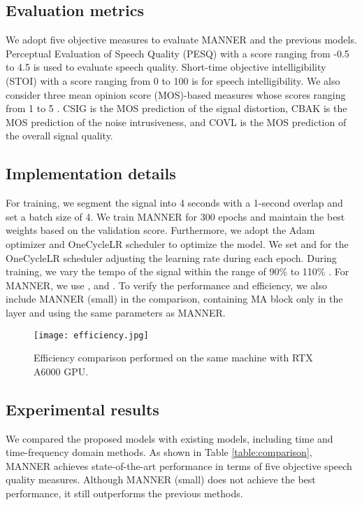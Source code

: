 \documentclass{article}
\begin{document}
\subsection{Evaluation metrics}
\label{sec:metric}
We adopt five objective measures to evaluate MANNER and the previous models. Perceptual Evaluation of Speech Quality (PESQ) \cite{recommendation2001perceptual} with a score ranging from -0.5 to 4.5 is used to evaluate speech quality. Short-time objective intelligibility (STOI) \cite{taal2011algorithm} with a score ranging from 0 to 100 is for speech intelligibility. We also consider three mean opinion score (MOS)-based measures whose scores ranging from 1 to 5 \cite{hu2007evaluation}. CSIG is the MOS prediction of the signal distortion, CBAK is the MOS prediction of the noise intrusiveness, and COVL is the MOS prediction of the overall signal quality.

\subsection{Implementation details}
\label{sec:implementation}
For training, we segment the signal into 4 seconds with a 1-second overlap and set a batch size of 4. We train MANNER for 300 epochs and maintain the best weights based on the validation score. Furthermore, we adopt the Adam optimizer and OneCycleLR scheduler to optimize the model. We set  and  for the OneCycleLR scheduler adjusting the learning rate during each epoch. During training, we vary the tempo of the signal within the range of 90\% to 110\% \cite{ko2015audio}. For MANNER, we use , and . To verify the performance and efficiency, we also include MANNER (small) in the comparison, containing MA block only in the  layer and using the same parameters as MANNER.
\begin{figure}[h]
\centerline{\texttt{[image: efficiency.jpg]}}
\caption{Efficiency comparison performed on the same machine with RTX A6000 GPU.}
\label{fig:efficiency comparison}
\end{figure}
\subsection{Experimental results}
\label{sec:experiment results}

We compared the proposed models with existing models, including time and time-frequency domain methods. As shown in Table \ref{table:comparison}, MANNER achieves state-of-the-art performance in terms of five objective speech quality measures. Although MANNER (small) does not achieve the best performance, it still outperforms the previous methods.
\end{document}
